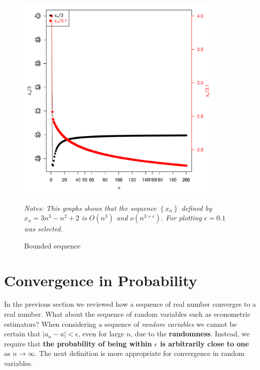 \documentclass[english,12pt]{book}\usepackage[]{graphicx}\usepackage[]{xcolor}
\newenvironment{knitrout}{}{} %
\begin{document}
\begin{figure}[ht]
  \caption{Bounded sequence}
    \label{fig:SeqConvBond}
    \centering
    \begin{minipage}{.9\linewidth}
\begin{knitrout}
\color{fgcolor}

{\centering \includegraphics[width=10cm,height=10cm]{figure/SeqConvBoun-1} 

}


\end{knitrout}
\footnotesize
		\emph{Notes: This graphs shows that the sequence $\left\lbrace x_n\right\rbrace$ defined by $x_n = 3n^3 - n^2 + 2$ is $O(n^3)$ and $o(n^{3 + \epsilon})$. For plotting $\epsilon = 0.1$ was selected.}
	\end{minipage}
\end{figure}


\section{Convergence in Probability}

In the previous section we reviewed how a sequence of real number converges to a real number.  What about the sequence of random variables such as econometric estimators? When considering a sequence of \emph{random variables} we cannot be certain that $\left| a_n - a\right|<\epsilon$, even for large $n$, due to the \textbf{randomness}. Instead, we require that \textbf{the probability of being within $\epsilon$ is arbitrarily close to one} as $n\to \infty$. The next definition is more appropriate for convergence in random variables. 
\end{document}
